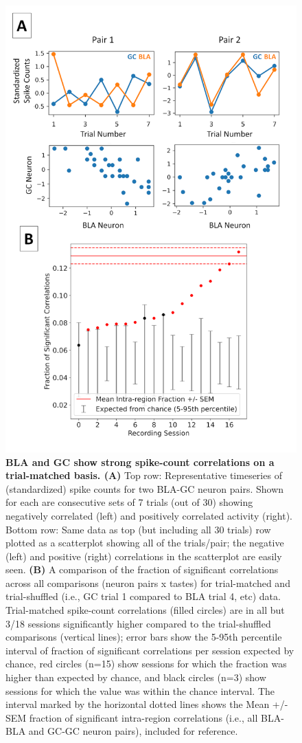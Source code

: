 \begin{refsection}
\begin{figure}
\centering
\includegraphics[width=0.5\linewidth]{mahmood_22_figures/fig6-0.png}
\caption{\textbf{BLA and GC show strong spike-count correlations on a trial-matched basis. (A)} Top row: Representative timeseries of (standardized) spike counts for two BLA-GC neuron pairs. Shown for each are consecutive sets of 7 trials (out of 30) showing negatively correlated (left) and positively correlated activity (right). Bottom row: Same data as top (but including all 30 trials) row plotted as a scatterplot showing all of the trials/pair; the negative (left) and positive (right) correlations in the scatterplot are easily seen. \textbf{(B)} A comparison of the fraction of significant correlations across all comparisons (neuron pairs x tastes) for trial-matched and trial-shuffled (i.e., GC trial 1 compared to BLA trial 4, etc) data. Trial-matched spike-count correlations (filled circles) are in all but 3/18 sessions significantly higher compared to the trial-shuffled comparisons (vertical lines); error bars show the 5-95th percentile interval of fraction of significant correlations per session expected by chance, red circles (n=15) show sessions for which the fraction was higher than expected by chance, and black circles (n=3) show sessions for which the value was within the chance interval. The interval marked by the horizontal dotted lines shows the Mean +/- SEM fraction of significant intra-region correlations (i.e., all BLA-BLA and GC-GC neuron pairs), included for reference.}
\label{fig:wrapfig}
\end{figure}


\end{refsection}
